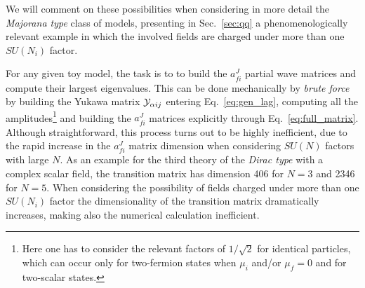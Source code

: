 \documentclass[a4paper,11pt]{article}
\begin{document}
We will comment on these possibilities when considering in more detail the {\emph{Majorana type}} class of models, presenting in Sec.~\ref{sec:qq} a phenomenologically relevant example in which the involved fields are charged under more than one $SU(N_i)$ factor.





For any given toy model, the task is to to build the $a_{fi}^J$ partial wave matrices and compute their largest eigenvalues. This can be done mechanically by {\emph{brute force}} by building the Yukawa matrix ${\cal Y}_{\alpha i j}$ entering Eq.~\eqref{eq:gen_lag}, computing all the amplitudes\footnote{Here one has to consider the relevant factors of $1/\sqrt{2}$ for identical particles, which can occur only for two-fermion states when $\mu_i$ and/or $\mu_f=0$ and for two-scalar states.} and building the $a_{fi}^J$ matrices explicitly through Eq.~\eqref{eq:full_matrix}.
Although straightforward, this process turns out to be highly inefficient, due to the rapid increase in the $a_{fi}^J$ matrix dimension when considering $SU(N)$ factors with large $N$. As an example for the third theory of the {\emph{Dirac type}} with a complex scalar field, the transition matrix has dimension 406 for $N=3$ and  2346 for $N=5$. When considering the possibility of fields charged under more than one $SU(N_i)$ factor the dimensionality of the transition matrix dramatically increases, making also the numerical calculation inefficient.
\end{document}
